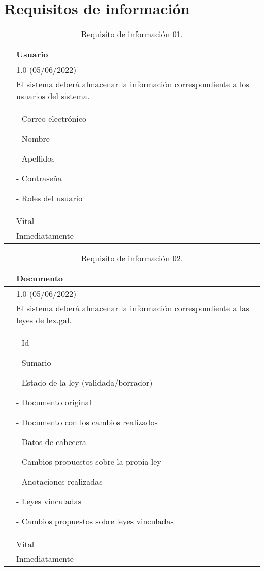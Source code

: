 \section{Requisitos de información}
\label{APRequisitosInformacion}

\begin{table}[H]
\begin{center}
\begin{tabular}{|p{3cm}|p{10cm}|} \hline
\centering {\bf IRQ-01} & Usuario  \\ \hline\hline
\centering {\bf Versión} & 1.0 (05/06/2022) \\ \hline
\centering {\bf Descripción} & El sistema deberá almacenar la información correspondiente a los usuarios del sistema. \\ \hline
\centering {\bf Datos específicos} & 
- Correo electrónico

- Nombre

- Apellidos

- Contraseña

- Roles del usuario
\\ \hline
\centering {\bf Importancia} & Vital \\ \hline
\centering {\bf Urgencia} & Inmediatamente \\ \hline
\end{tabular}
\caption{Requisito de información 01.}
\label{enlaceIRQ1}
\end{center}
\end{table}

\begin{table}[H]
\begin{center}
\begin{tabular}{|p{3cm}|p{10cm}|} \hline
\centering {\bf IRQ-02} & Documento  \\ \hline\hline
\centering {\bf Versión} & 1.0 (05/06/2022) \\ \hline
\centering {\bf Descripción} & El sistema deberá almacenar la información correspondiente a las leyes de lex.gal. \\ \hline
\centering {\bf Datos específicos}  & 
- Id

- Sumario

- Estado de la ley (validada/borrador)

- Documento original

- Documento con los cambios realizados

- Datos de cabecera

- Cambios propuestos sobre la propia ley

- Anotaciones realizadas

- Leyes vinculadas

- Cambios propuestos sobre leyes vinculadas
\\ \hline
\centering {\bf Importancia} & Vital \\ \hline
\centering {\bf Urgencia} & Inmediatamente \\ \hline
\end{tabular}
\caption{Requisito de información 02.}
\label{enlaceIRQ2}
\end{center}
\end{table}